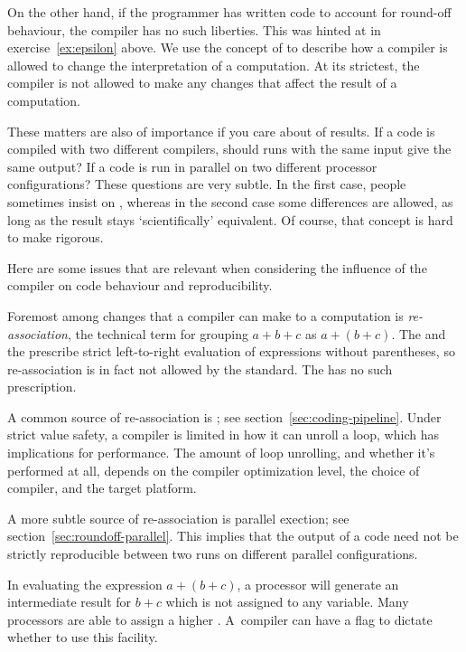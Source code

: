 On the other hand, if the programmer has written code to account for
round-off behaviour, the compiler has no such liberties. This was
hinted at in exercise~\ref{ex:epsilon} above.
We use the concept of  to describe
how a compiler is allowed to change the interpretation of a computation.
At its strictest, the compiler is not allowed
to make any changes that affect the result of a computation. 

These matters are also of importance if you care about
 of results. If a code is compiled with 
two different compilers, should runs with the same input give
the same output? If a code is run in parallel on two different 
processor configurations? These questions are very subtle.
In the first case, people sometimes insist on 
, whereas
in the second case some differences are allowed, as long
as the result stays `scientifically' equivalent. Of course,
that concept is hard to make rigorous.

Here are some issues that are relevant
when considering the influence of the compiler
on code behaviour and reproducibility.

Foremost among changes that a compiler can
make to a computation is \emph{re-association}, the technical
term for grouping $a+b+c$ as $a+(b+c)$. The  and the  prescribe
strict left-to-right evaluation of expressions without parentheses, so
re-association is in fact not allowed by the standard. The
 has no such prescription.

A common source of re-association is ; see
section~\ref{sec:coding-pipeline}. Under strict value safety,
a compiler is limited in how it can unroll a loop, which has implications
for performance. The amount of loop unrolling,
and whether it's performed at all, depends on the compiler optimization level,
the choice of compiler, and the target platform.

A more subtle source of re-association is parallel exection; 
see section~\ref{sec:roundoff-parallel}. This implies that the output
of a code need not be strictly reproducible between two runs on
different parallel configurations.


In evaluating the expression $a+(b+c)$, a processor will generate an 
intermediate result for $b+c$ which is not assigned to any variable.
Many processors are able to assign a higher 
.
A~compiler can have a flag to dictate whether to use this facility.

